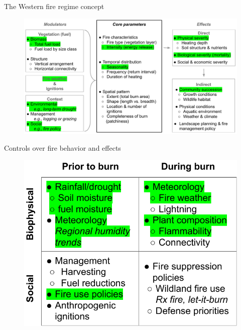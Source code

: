 \documentclass[11pt]{beamer}
\begin{document}
\begin{frame}{The Western fire regime concept } 
	\begin{center}
		\begin{figure}
			\includegraphics[width=1\linewidth]{figs/FireRegimeNAPC} 
		\end{figure}
	\end{center}
\end{frame}

\begin{frame}{Controls over fire behavior and effects}
	\begin{center}
		\begin{figure}
			\includegraphics[width=0.9\linewidth]{figs/FireRegimeModulatorsNAPC} 
		\end{figure}
	\end{center}
\end{frame}
\end{document}
